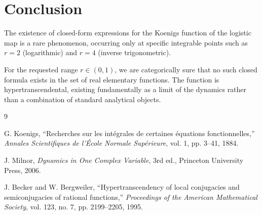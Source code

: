 \documentclass[11pt, a4paper]{article}
\theoremstyle{definition}
\begin{document}
\section{Conclusion}

The existence of closed-form expressions for the Koenigs function of the logistic map is a rare phenomenon, occurring only at specific integrable points such as $r=2$ (logarithmic) and $r=4$ (inverse trigonometric).

For the requested range $r \in (0,1)$, we are categorically sure that no such closed formula exists in the set of real elementary functions. The function is hypertranscendental, existing fundamentally as a limit of the dynamics rather than a combination of standard analytical objects.

\begin{thebibliography}{9}

G. Koenigs,
``Recherches sur les intégrales de certaines équations fonctionnelles,''
\textit{Annales Scientifiques de l'École Normale Supérieure}, vol. 1, pp. 3--41, 1884.

J. Milnor,
\textit{Dynamics in One Complex Variable}, 3rd ed.,
Princeton University Press, 2006.

J. Becker and W. Bergweiler,
``Hypertranscendency of local conjugacies and semiconjugacies of rational functions,''
\textit{Proceedings of the American Mathematical Society}, vol. 123, no. 7, pp. 2199--2205, 1995.

\end{thebibliography}
\end{document}
